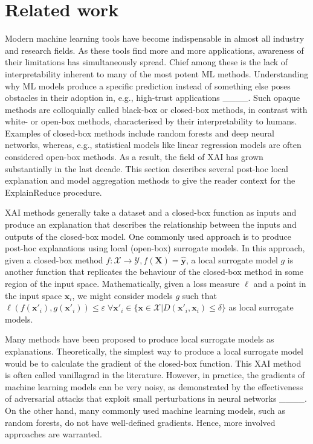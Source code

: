 \section{Related work}
Modern machine learning tools have become indispensable in almost all industry and research fields.
As these tools find more and more applications, awareness of their limitations has simultaneously spread.
Chief among these is the lack of interpretability inherent to many of the most potent ML methods.
Understanding why ML models produce a specific prediction instead of something else poses obstacles in their adoption in, e.g., high-trust applications ____.
Such opaque methods are colloquially called black-box or closed-box methods, in contrast with white- or open-box methods, characterised by their interpretability to humans.
Examples of closed-box methods include random forests and deep neural networks, whereas, e.g., statistical models like linear regression models are often considered open-box methods.
As a result, the field of XAI has grown substantially in the last decade.
This section describes several post-hoc local explanation and model aggregation methods to give the reader context for the {\sc ExplainReduce} procedure.

XAI methods generally take a dataset and a closed-box function as inputs and produce an explanation that describes the relationship between the inputs and outputs of the closed-box model.
One commonly used approach is to produce post-hoc explanations using local (open-box) surrogate models.
In this approach, given a closed-box method $f: \mathcal{X} \rightarrow \mathcal{Y}, f(\bm{X}) = \hat{\bm{y}}$, a local surrogate model $g$ is another function that replicates the behaviour of the closed-box method in some region of the input space.
Mathematically, given a loss measure $\ell$ and a point in the input space $\bm{x}_i$, we might consider models $g$ such that $\ell(f(\bm{x}'_i), g(\bm{x}'_i)) \leq \varepsilon \; \forall \bm{x}'_i \in \{\bm{x} \in \mathcal{X} | D(\bm{x}'_i, \bm{x}_i) \leq \delta \}$ as local surrogate models.

Many methods have been proposed to produce local surrogate models as explanations.
Theoretically, the simplest way to produce a local surrogate model would be to calculate the gradient of the closed-box function.
This XAI method is often called {\sc vanillagrad} in the literature.
However, in practice, the gradients of machine learning models can be very noisy, as demonstrated by the effectiveness of adversarial attacks that exploit small perturbations in neural networks ____.
On the other hand, many commonly used machine learning models, such as random forests, do not have well-defined gradients.
Hence, more involved approaches are warranted. 

